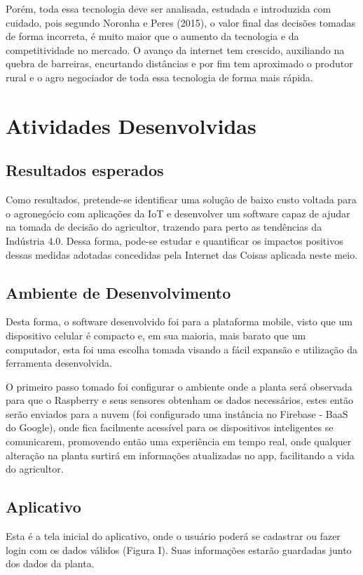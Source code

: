 \documentclass[eso]{bcc}
\begin{document}
Porém, toda essa tecnologia deve ser analisada, estudada e introduzida com cuidado, 
pois segundo Noronha e Peres (2015), o valor final das decisões tomadas de forma incorreta, 
é muito maior que o aumento da tecnologia e da competitividade no mercado. 
O avanço da internet tem crescido, auxiliando na quebra de barreiras, encurtando distâncias e 
por fim tem aproximado o produtor rural e o agro negociador de toda essa tecnologia de forma mais rápida.

\chapter{Atividades Desenvolvidas}\label{chap:atividades}

\section{Resultados esperados}
Como resultados, pretende-se identificar uma solução de baixo custo voltada para o agronegócio 
com aplicações da IoT e desenvolver um software capaz de ajudar na tomada de decisão do agricultor, 
trazendo para perto as tendências da Indústria 4.0. Dessa forma, pode-se estudar e quantificar os 
impactos positivos dessas medidas adotadas concedidas pela Internet das Coisas aplicada neste meio.

\section{Ambiente de Desenvolvimento}
Desta forma, o software desenvolvido foi para a plataforma mobile, visto que um dispositivo 
celular é compacto e, em sua maioria, mais barato que um computador, esta foi uma escolha 
tomada visando a fácil expansão e utilização da ferramenta desenvolvida.

O primeiro passo tomado foi configurar o ambiente onde a planta será observada para que o 
Raspberry e seus sensores obtenham os  dados necessários, estes então serão enviados para a 
nuvem (foi configurado uma instância no Firebase - BaaS do Google), onde fica facilmente acessível 
para os dispositivos inteligentes se comunicarem, promovendo então uma experiência em tempo real, 
onde qualquer alteração na planta surtirá em informações atualizadas no app, facilitando a vida 
do agricultor.

\section{Aplicativo}
Esta é a tela inicial do aplicativo, onde o usuário poderá se cadastrar ou fazer login com 
os dados válidos (Figura I). Suas informações estarão guardadas junto dos dados da planta.
\end{document}
